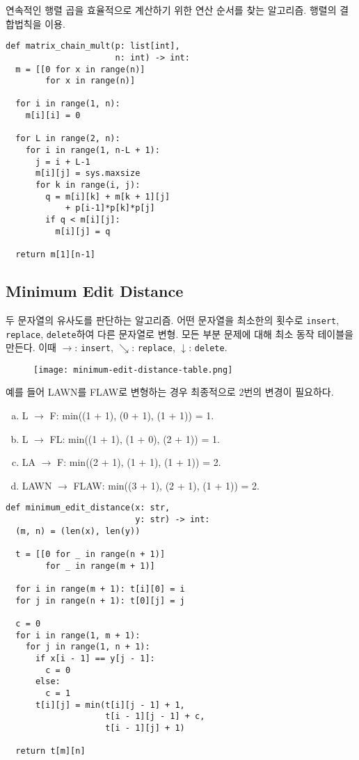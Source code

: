 연속적인 행렬 곱을 효율적으로 계산하기 위한 연산 순서를 찾는 알고리즘. 행렬의 결합법칙을 이용.

\begin{verbatim}
def matrix_chain_mult(p: list[int],
                      n: int) -> int:
  m = [[0 for x in range(n)]
        for x in range(n)]

  for i in range(1, n):
    m[i][i] = 0

  for L in range(2, n):
    for i in range(1, n-L + 1):
      j = i + L-1
      m[i][j] = sys.maxsize
      for k in range(i, j):
        q = m[i][k] + m[k + 1][j]
            + p[i-1]*p[k]*p[j]
        if q < m[i][j]:
          m[i][j] = q

  return m[1][n-1]
\end{verbatim}

\subsection{Minimum Edit Distance}

두 문자열의 유사도를 판단하는 알고리즘. 어떤 문자열을 최소한의 횟수로 \texttt{insert}, \texttt{replace}, \texttt{delete}하여 다른 문자열로 변형. 모든 부분 문제에 대해 최소 동작 테이블을 만든다. 이때 $\rightarrow$: \texttt{insert}, $\searrow$: \texttt{replace}, $\downarrow$: \texttt{delete}.

\begin{figure}[h]
  \centering
  \texttt{[image: minimum-edit-distance-table.png]}
\end{figure}

예를 들어 LAWN를 FLAW로 변형하는 경우 최종적으로 2번의 변경이 필요하다.

\begin{enumerate}[(a)]
  \item L $\rightarrow$ F: min((1 + 1), (0 + 1), (1 + 1)) = 1.
  \item L $\rightarrow$ FL: min((1 + 1), (1 + 0), (2 + 1)) = 1.
  \item LA $\rightarrow$ F: min((2 + 1), (1 + 1), (1 + 1)) = 2.
  \item LAWN $\rightarrow$ FLAW: min((3 + 1), (2 + 1), (1 + 1)) = 2.
\end{enumerate}

\begin{verbatim}
def minimum_edit_distance(x: str,
                          y: str) -> int:
  (m, n) = (len(x), len(y))

  t = [[0 for _ in range(n + 1)]
        for _ in range(m + 1)]

  for i in range(m + 1): t[i][0] = i
  for j in range(n + 1): t[0][j] = j

  c = 0
  for i in range(1, m + 1):
    for j in range(1, n + 1):
      if x[i - 1] == y[j - 1]:
        c = 0
      else:
        c = 1
      t[i][j] = min(t[i][j - 1] + 1,
                    t[i - 1][j - 1] + c,
                    t[i - 1][j] + 1)

  return t[m][n]
\end{verbatim}


